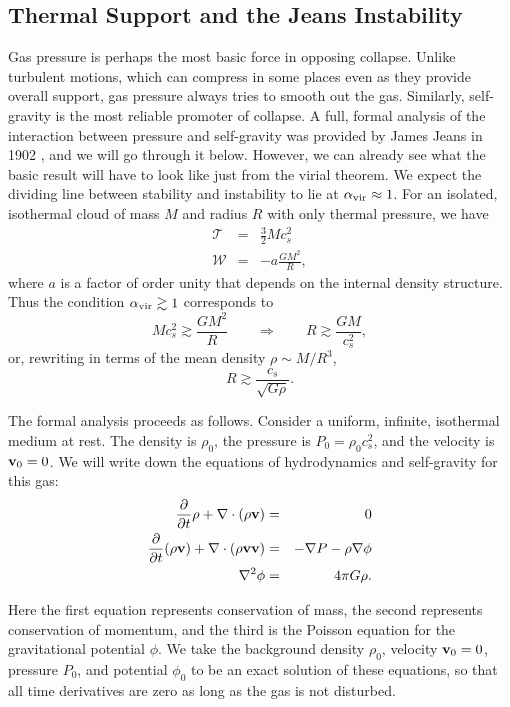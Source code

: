 \subsection{Thermal Support and the Jeans Instability}

Gas pressure is perhaps the most basic force in opposing collapse. Unlike turbulent motions, which can compress in some places even as they provide overall support, gas pressure always tries to smooth out the gas. Similarly, self-gravity is the most reliable promoter of collapse. A full, formal analysis of the interaction between pressure and self-gravity was provided by James Jeans in 1902 \citep{jeans02a}, and we will go through it below. However, we can already see what the basic result will have to look like just from the virial theorem. We expect the dividing line between stability and instability to lie at $\alpha_{\rm vir} \approx 1$. For an isolated, isothermal cloud of mass $M$ and radius $R$ with only thermal pressure, we have
\begin{eqnarray}
\mathcal{T} & = & \frac{3}{2} M c_s^2 \\
\mathcal{W} & = & -a \frac{GM^2}{R},
\end{eqnarray}
where $a$ is a factor of order unity that depends on the internal density structure. Thus the condition $\alpha_{\rm vir} \gtrsim 1$ corresponds to
\begin{equation}
M c_s^2 \gtrsim \frac{GM^2}{R} \qquad\Longrightarrow\qquad R \gtrsim \frac{GM}{c_s^2},
\end{equation}
or, rewriting in terms of the mean density $\rho \sim M/R^3$,
\begin{equation}
R \gtrsim \frac{c_s}{\sqrt{G\rho}}.
\end{equation}

The formal analysis proceeds as follows. Consider a uniform, infinite, isothermal medium at rest. The density is $\rho_0$, the pressure is $P_0 = \rho_0 c_s^2$, and the velocity is $\mathbf{v}_0 = 0$. We will write down the equations of hydrodynamics and self-gravity for this gas:
\begin{eqnarray}
\frac{\partial}{\partial t}\rho + \nabla\cdot (\rho \mathbf{v}) & = & 0 \\
\frac{\partial}{\partial t}(\rho\mathbf{v}) + \nabla\cdot(\rho \mathbf{v}\mathbf{v}) & = & -\nabla P - \rho \nabla \phi \\
\nabla^2 \phi & = & 4\pi G\rho.
\end{eqnarray}

Here the first equation represents conservation of mass, the second represents conservation of momentum, and the third is the Poisson equation for the gravitational potential $\phi$. We take the background density $\rho_0$, velocity $\mathbf{v}_0 = 0$, pressure $P_0$, and potential $\phi_0$ to be an exact solution of these equations, so that all time derivatives are zero as long as the gas is not disturbed.

